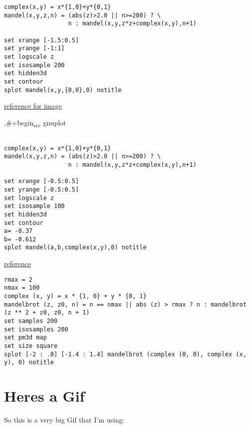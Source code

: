 \documentclass[11pt]{article}
\begin{document}
\begin{verbatim}
complex(x,y) = x*{1,0}+y*{0,1}
mandel(x,y,z,n) = (abs(z)>2.0 || n>=200) ? \
                  n : mandel(x,y,z*z+complex(x,y),n+1)

set xrange [-1.5:0.5]
set yrange [-1:1]
set logscale z
set isosample 200
set hidden3d
set contour
splot mandel(x,y,{0,0},0) notitle
\end{verbatim}

\begin{center}

\end{center}


\href{http://folk.uio.no/inf3330/scripting/doc/gnuplot/Kawano/fractal/mandelbrot-e.html}{reference for image}

,\#+begin\textsubscript{src} gnuplot
\begin{verbatim}

complex(x,y) = x*{1,0}+y*{0,1}
mandel(x,y,z,n) = (abs(z)>2.0 || n>=200) ? \
                  n : mandel(x,y,z*z+complex(x,y),n+1)

set xrange [-0.5:0.5]
set yrange [-0.5:0.5]
set logscale z
set isosample 100
set hidden3d
set contour
a= -0.37
b= -0.612
splot mandel(a,b,complex(x,y),0) notitle
\end{verbatim}

\begin{center}

\end{center}




\href{https://rosettacode.org/wiki/Mandelbrot\_set\#Python}{reference}


\begin{verbatim}
rmax = 2
nmax = 100
complex (x, y) = x * {1, 0} + y * {0, 1}
mandelbrot (z, z0, n) = n == nmax || abs (z) > rmax ? n : mandelbrot (z ** 2 + z0, z0, n + 1)
set samples 200
set isosamples 200
set pm3d map
set size square
splot [-2 : .8] [-1.4 : 1.4] mandelbrot (complex (0, 0), complex (x, y), 0) notitle
\end{verbatim}

\begin{center}

\end{center}




\section{Heres a Gif}
\label{sec:orgccade84}
So this is a very big Gif that I'm using:
\end{document}
